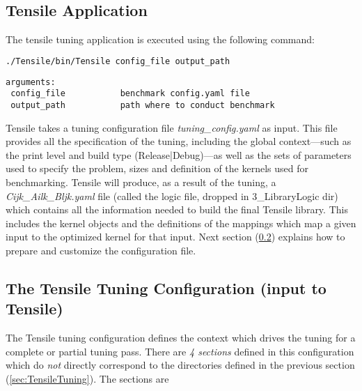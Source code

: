 \documentclass[]{article}
\begin{document}
\subsection{Tensile Application}
The tensile tuning application is executed using the following command:

\begin{lstlisting}[language=bash]
./Tensile/bin/Tensile config_file output_path
\end{lstlisting}

\begin{lstlisting}
arguments:
 config_file           benchmark config.yaml file
 output_path           path where to conduct benchmark
\end{lstlisting}

Tensile takes a tuning configuration file \emph{tuning\_config.yaml} as input. This file provides all the specification of the tuning, including the global context---such as the print level and build type (Release|Debug)---as well as the sets of parameters used to specify the problem, sizes and definition of the kernels used for benchmarking. Tensile will produce, as a result of the tuning, a \emph{Cijk\_Ailk\_Bljk.yaml} file (called the logic file, dropped in 3\_LibraryLogic dir) which contains all the information needed to build the final Tensile library. This includes the kernel objects and the definitions of the mappings which map a given input to the optimized kernel for that input. Next section (\ref{sec:configfile}) explains how to prepare and customize the configuration file.


\subsection{The Tensile Tuning Configuration (input to Tensile)}
\label{sec:configfile}
The Tensile tuning configuration defines the context which drives the tuning for a complete or partial tuning pass. There are \textit{4 sections} defined in this configuration which do \textit{not} directly correspond to the directories defined in the previous section (\ref{sec:TensileTuning}). The sections are
\end{document}
